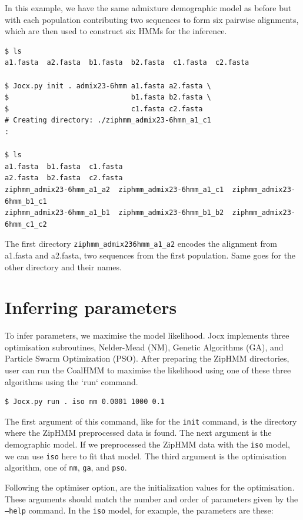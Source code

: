 \documentclass[graybox]{svmult}
\begin{document}
In this example, we have the same admixture demographic model as before but with each population contributing two sequences to form six pairwise alignments, which are then used to construct six HMMs for the inference.

 {\scriptsize{}\begin{verbatim}
$ ls
a1.fasta  a2.fasta  b1.fasta  b2.fasta  c1.fasta  c2.fasta

$ Jocx.py init . admix23-6hmm a1.fasta a2.fasta \
$                             b1.fasta b2.fasta \
$                             c1.fasta c2.fasta
# Creating directory: ./ziphmm_admix23-6hmm_a1_c1
:

$ ls
a1.fasta  b1.fasta  c1.fasta
a2.fasta  b2.fasta  c2.fasta
ziphmm_admix23-6hmm_a1_a2  ziphmm_admix23-6hmm_a1_c1  ziphmm_admix23-6hmm_b1_c1
ziphmm_admix23-6hmm_a1_b1  ziphmm_admix23-6hmm_b1_b2  ziphmm_admix23-6hmm_c1_c2
\end{verbatim}}

The first directory \texttt{ziphmm\_admix23\-6hmm\_a1\_a2} encodes the alignment from a1.fasta and a2.fasta, two sequences from the first population.  Same goes for the other directory and their names.

\section{Inferring parameters}

To infer parameters, we maximise the model likelihood. Jocx implements three optimisation subroutines, Nelder-Mead (NM), Genetic Algorithms (GA), and Particle Swarm Optimization (PSO). After preparing the ZipHMM directories, user can run the CoalHMM to maximise the likelihood using one of these three algorithms using the `run` command.

 {\scriptsize{}\begin{verbatim}
$ Jocx.py run . iso nm 0.0001 1000 0.1
\end{verbatim}}

The first argument of this command, like for the \texttt{init} command, is the directory where the ZipHMM preprocessed data is found. The next argument is the demographic model. If we preprocessed the ZipHMM data with the \texttt{iso} model, we can use \texttt{iso} here to fit that model. The third argument is the optimisation algorithm, one of \texttt{nm}, \texttt{ga}, and \texttt{pso}.

Following the optimiser option,
are the initialization values for the optimisation. These arguments should match the number and order of parameters given by the \texttt{--help} command. In the \texttt{iso} model, for example, the parameters are these:
\end{document}
